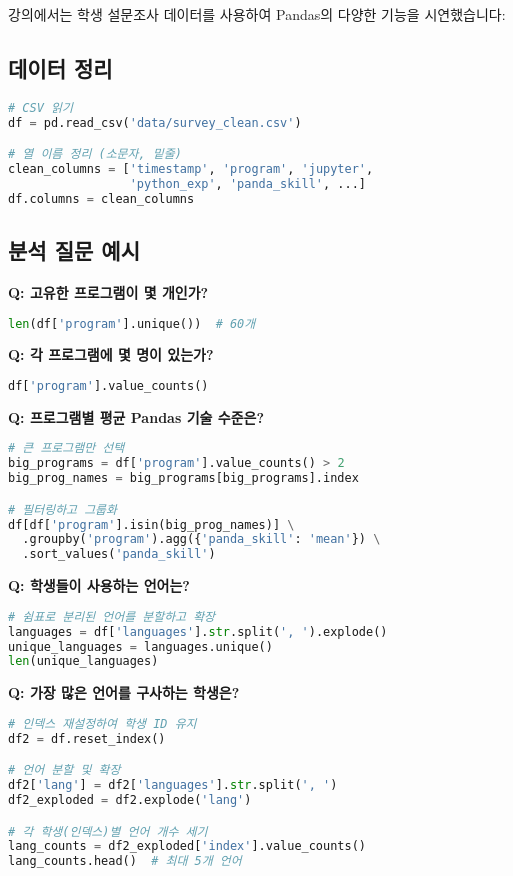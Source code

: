 \documentclass[12pt,a4paper]{article}
\begin{document}
강의에서는 학생 설문조사 데이터를 사용하여 Pandas의 다양한 기능을 시연했습니다:

\subsection{데이터 정리}

\begin{lstlisting}[language=Python]
# CSV 읽기
df = pd.read_csv('data/survey_clean.csv')

# 열 이름 정리 (소문자, 밑줄)
clean_columns = ['timestamp', 'program', 'jupyter',
                 'python_exp', 'panda_skill', ...]
df.columns = clean_columns
\end{lstlisting}

\subsection{분석 질문 예시}

\textbf{Q: 고유한 프로그램이 몇 개인가?}
\begin{lstlisting}[language=Python]
len(df['program'].unique())  # 60개
\end{lstlisting}

\textbf{Q: 각 프로그램에 몇 명이 있는가?}
\begin{lstlisting}[language=Python]
df['program'].value_counts()
\end{lstlisting}

\textbf{Q: 프로그램별 평균 Pandas 기술 수준은?}
\begin{lstlisting}[language=Python]
# 큰 프로그램만 선택
big_programs = df['program'].value_counts() > 2
big_prog_names = big_programs[big_programs].index

# 필터링하고 그룹화
df[df['program'].isin(big_prog_names)] \
  .groupby('program').agg({'panda_skill': 'mean'}) \
  .sort_values('panda_skill')
\end{lstlisting}

\textbf{Q: 학생들이 사용하는 언어는?}
\begin{lstlisting}[language=Python]
# 쉼표로 분리된 언어를 분할하고 확장
languages = df['languages'].str.split(', ').explode()
unique_languages = languages.unique()
len(unique_languages)
\end{lstlisting}

\textbf{Q: 가장 많은 언어를 구사하는 학생은?}
\begin{lstlisting}[language=Python]
# 인덱스 재설정하여 학생 ID 유지
df2 = df.reset_index()

# 언어 분할 및 확장
df2['lang'] = df2['languages'].str.split(', ')
df2_exploded = df2.explode('lang')

# 각 학생(인덱스)별 언어 개수 세기
lang_counts = df2_exploded['index'].value_counts()
lang_counts.head()  # 최대 5개 언어
\end{lstlisting}
\end{document}
